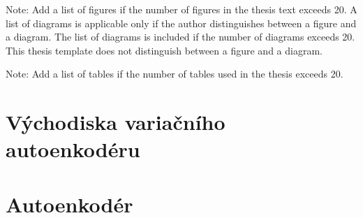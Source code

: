 \documentclass[11pt,a4paper]{report}
\let\openright=\clearpage
\begin{document}


\setcounter{tocdepth}{2}
\tableofcontents

\openright
\listoffigures
Note: Add a list of figures if the number of figures in the thesis text exceeds 20. A list of diagrams is applicable only if the author distinguishes between a figure and a diagram. The list of diagrams is included if the number of diagrams exceeds 20. This thesis template does not distinguish between a figure and a diagram.

\clearpage
\listoftables
Note: Add a list of tables if the number of tables used in the thesis exceeds 20. 



\pagestyle{fancyx}
{%
\pagestyle{plain}

}

\chapter{Východiska variačního autoenkodéru}







\chapter{Autoenkodér}
\label{chap:autoencoder}














\end{document}
